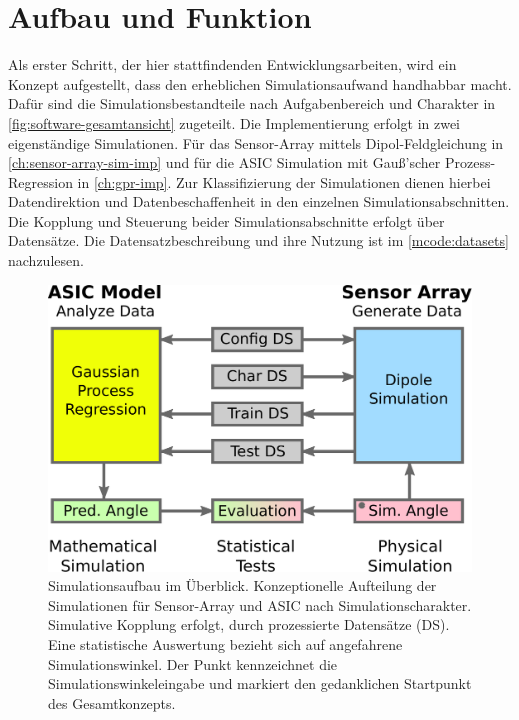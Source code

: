 %


\section{Aufbau und Funktion}\label{sec:aufbau-und-funktion}


Als erster Schritt, der hier stattfindenden Entwicklungsarbeiten, wird ein Konzept aufgestellt, dass den erheblichen Simulationsaufwand handhabbar macht. Dafür sind die Simulationsbestandteile nach Aufgabenbereich und Charakter in \autoref{fig:software-gesamtansicht} zugeteilt. Die Implementierung erfolgt in zwei eigenständige Simulationen. Für das Sensor-Array mittels Dipol-Feldgleichung in \autoref{ch:sensor-array-sim-imp} und für die ASIC Simulation mit Gauß'scher Prozess-Regression in \autoref{ch:gpr-imp}. Zur Klassifizierung der Simulationen dienen hierbei Datendirektion und Datenbeschaffenheit in den einzelnen Simulationsabschnitten. Die Kopplung und Steuerung beider Simulationsabschnitte erfolgt über Datensätze. Die Datensatzbeschreibung und ihre Nutzung ist im \autoref{mcode:datasets} nachzulesen. 


\clearpage


\begin{figure}[htp]
	\centering
	\includegraphics[width=0.7\linewidth]{chapters/images/3-SW-E-OExp/Software-Gesamtansicht}
	\caption[Simulationsaufbau im Überblick]{Simulationsaufbau im Überblick. Konzeptionelle Aufteilung der Simulationen für Sensor-Array und ASIC nach Simulationscharakter. Simulative Kopplung erfolgt, durch prozessierte Datensätze (DS). Eine statistische Auswertung bezieht sich auf angefahrene Simulationswinkel. Der Punkt kennzeichnet die Simulationswinkeleingabe und markiert den gedanklichen Startpunkt des Gesamtkonzepts.}
	\label{fig:software-gesamtansicht}
\end{figure}


